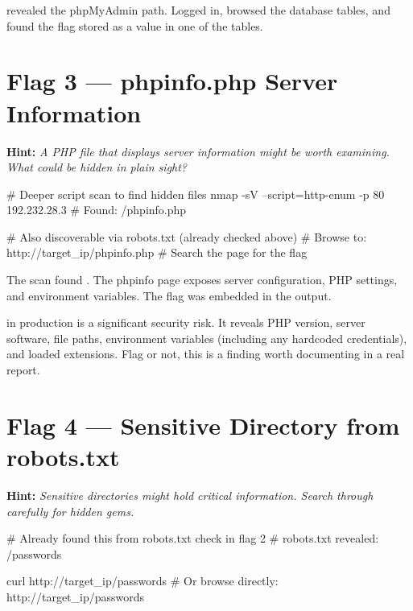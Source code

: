 \begin{takebox}

 revealed the phpMyAdmin path. Logged in, browsed the database
tables, and found the flag stored as a value in one of the tables.

\section*{Flag 3 --- phpinfo.php Server Information}

\textbf{Hint:} \textit{A PHP file that displays server information might be worth
examining. What could be hidden in plain sight?}

\begin{termbox}
# Deeper script scan to find hidden files
nmap -sV --script=http-enum -p 80 192.232.28.3
# Found: /phpinfo.php

# Also discoverable via robots.txt (already checked above)
# Browse to: http://target_ip/phpinfo.php
# Search the page for the flag
\end{termbox}

The  scan found . The phpinfo
page exposes server configuration, PHP settings, and environment variables.
The flag was embedded in the output.

\begin{notebox}
 in production is a significant security risk. It reveals PHP
version, server software, file paths, environment variables (including any
hardcoded credentials), and loaded extensions. Flag or not, this is a finding
worth documenting in a real report.
\end{notebox}

\section*{Flag 4 --- Sensitive Directory from robots.txt}

\textbf{Hint:} \textit{Sensitive directories might hold critical information.
Search through carefully for hidden gems.}

\begin{termbox}
# Already found this from robots.txt check in flag 2
# robots.txt revealed: /passwords

curl http://target_ip/passwords
# Or browse directly: http://target_ip/passwords
\end{termbox}


\end{takebox}
